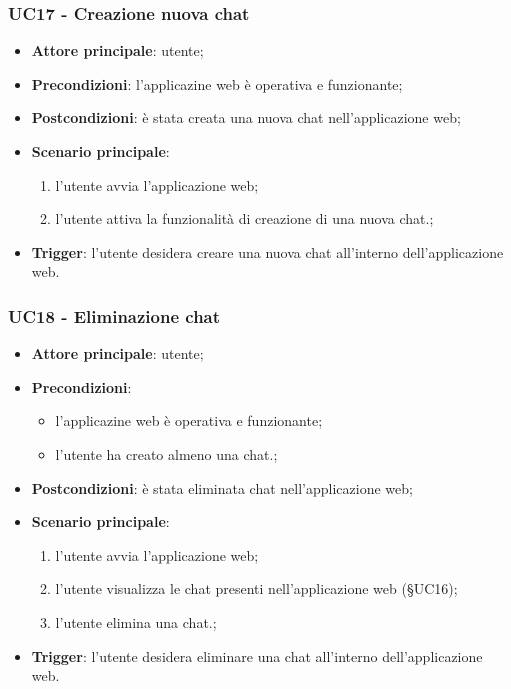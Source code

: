 \documentclass[10pt, a4paper]{article}
\begin{document}
    \subsubsection{UC17 - Creazione nuova chat}
    \begin{itemize}
        \item \textbf{Attore principale}: utente;
        \item \textbf{Precondizioni}: l'applicazine web è operativa e funzionante;
        \item \textbf{Postcondizioni}: è stata creata una nuova chat nell'applicazione web;
        \item \textbf{Scenario principale}:
            \begin{enumerate}
                \item l'utente avvia l'applicazione web;
                \item l'utente attiva la funzionalità di creazione di una nuova chat.;
            \end{enumerate}
        \item \textbf{Trigger}: l'utente desidera creare una nuova chat all'interno dell'applicazione web.
    \end{itemize}

    \subsubsection{UC18 - Eliminazione chat}
    \begin{itemize}
        \item \textbf{Attore principale}: utente;
        \item \textbf{Precondizioni}:
        \begin{itemize}
            \item l'applicazine web è operativa e funzionante;
            \item l'utente ha creato almeno una chat.;
        \end{itemize}
        \item \textbf{Postcondizioni}: è stata eliminata chat nell'applicazione web;
        \item \textbf{Scenario principale}:
            \begin{enumerate}
                \item l'utente avvia l'applicazione web;
                \item l'utente visualizza le chat presenti nell'applicazione web (\S UC16);
                \item l'utente elimina una chat.;
            \end{enumerate}
        \item \textbf{Trigger}: l'utente desidera eliminare una chat all'interno dell'applicazione web.
    \end{itemize}
\end{document}
